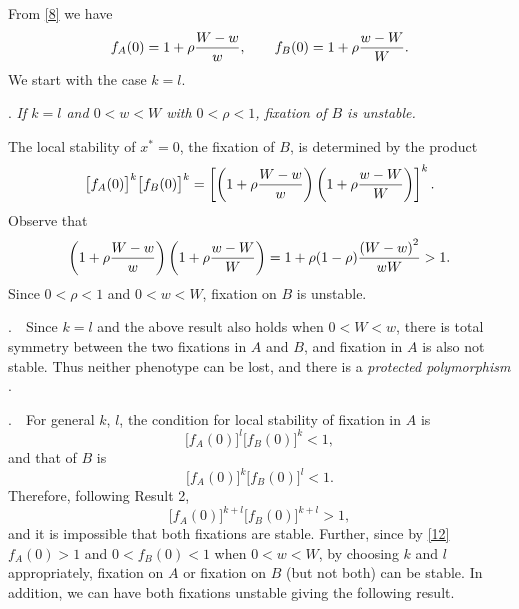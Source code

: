 \documentclass[9pt,twocolumn,twoside,lineno]{pnas-new}
\begin{document}
   From \eqref{8} we have
   \begin{equation}
   f_A(0) = 1+\rho{W-w\over w},\qquad
   f_B(0) = 1+\rho{w-W\over W}.\label{12}\end{equation}
   We start with the case $k=l$.
   \medskip
   
   . {\sl If $k=l$ and $0<w<W$ with $0<\rho<1$, fixation of $B$ is unstable.}\par
   \medskip
   
    The local stability of $x^*=0$, the fixation of $B$, is determined by the product
   \begin{equation}
   \bigl[f_A(0)\bigr]^k \bigl[f_B(0)\bigr]^k=\left[\left(1+\rho{W-w\over w}\right)\left(1+\rho{w-W\over W}\right)\right]^k.\label{13}\end{equation}
   Observe that
   \begin{equation}
   \left(1+\rho{W-w\over w}\right)\left(1+\rho{w-W\over W}\right) = 1+\rho(1-\rho){\left(W-w\right)^2\over wW}>1.\label{14}\end{equation}
   Since $0<\rho<1$ and $0<w<W$,  fixation on $B$ is unstable.
  \bigskip

\smallskip

.\ \ Since $k=l$ and the above result also holds  when $0<W<w$, there is total symmetry between the two fixations in $A$ and $B$, and fixation in $A$ is also not stable. Thus neither phenotype can be lost, and there is a {\sl protected polymorphism} \cite{prout1968sufficient}.
\smallskip

.\ \ For general $k$, $l$, the condition for local stability of fixation in $A$ is
\begin{equation}\bigl[f_A(0)\bigr]^l \bigl[f_B(0)\bigr]^k <1, \label{15}\end{equation}
and that of $B$ is
\begin{equation}\bigl[f_A(0)\bigr]^k \bigl[f_B(0)\bigr]^l <1. \label{16}\end{equation}
Therefore, following Result 2, 
\begin{equation}\bigl[f_A(0)\bigr]^{k+l}\bigl[f_B(0)\bigr]^{k+l}>1,\label{17}\end{equation}
and it is impossible that both fixations are stable. Further, since by \eqref{12}  $f_A(0)>1$ and $0<f_B(0)<1$ when $0<w<W$, by choosing $k$ and $l$ appropriately, fixation on $A$ or fixation on $B$ (but not both) can be stable. In addition, we can have both fixations unstable giving the following result.
\medskip
\end{document}
